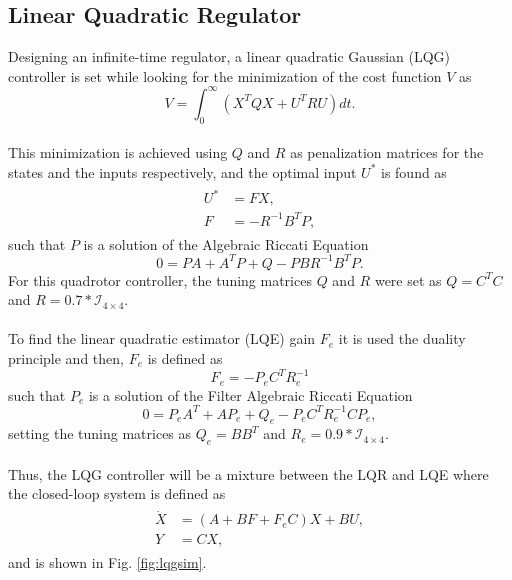 \subsection{Linear Quadratic Regulator}
Designing an infinite-time regulator, a linear quadratic Gaussian (LQG) controller is set while looking for the minimization of the cost function $V$ as
	\begin{equation}
	V = \int_{0}^{\infty}(X^{T}QX + U^{T}RU) dt.
	\end{equation}
\\This minimization is achieved using $Q$ and $R$ as penalization matrices for the states and the inputs respectively, and the optimal input $U^{*}$ is found as
\begin{align}
\begin{split}
U^{*}&= FX,\\
F &= -R^{-1}B^{T}P,
\end{split}
\end{align}
such that $P$ is a solution of the Algebraic Riccati Equation \cite{RobustWerner2013}
	\begin{equation}
	0 = PA + A^{T}P + Q - PBR^{-1}B^{T}P.
	\end{equation}
For this quadrotor controller, the tuning matrices $Q$ and $R$ were set as $Q = C^{T}C$ and $R = 0.7* \mathcal{I}_{4\times4}$.
\\\\To find the linear quadratic estimator (LQE) gain $F_{e}$ it is used the duality principle and then, $F_{e}$ is defined as
	\begin{equation}
	F_{e} = -P_{e}C^{T}R_{e}^{-1}
	\end{equation}
	such that $P_e$ is a solution of the Filter Algebraic Riccati Equation
	\begin{equation}
	0 = P_{e}A^{T} + AP_{e} + Q_{e} - P_{e}C^{T}R_{e}^{-1}CP_{e},
	\end{equation}
setting the tuning matrices as $Q_{e} = BB^{T}$ and $R_{e} = 0.9*\mathcal{I}_{4\times4}$.
\\\\Thus, the LQG controller will be a mixture between the LQR and LQE where the closed-loop system is defined as  
\begin{align}
\label{eqn:ssgcl}
\begin{split}
\dot{X} &= (A+BF+F_{e}C)X + BU,\\
Y &= CX,
\end{split}
\end{align}
and is shown in Fig. \ref{fig:lqgsim}.
